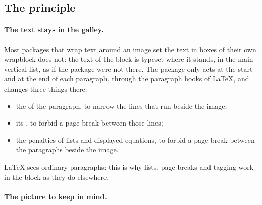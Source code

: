 \documentclass[a4paper,11pt]{article}
\newcommand\pkg[1]{\textsf{#1}}
\newcommand\key[1]{\texttt{#1}}
\newcommand\gv[1]{\mbox{\texttt{\textbackslash g\_\_wrapblock\_}}\csurl{#1}}
\begin{document}
\subsection{The principle}

\paragraph{The text stays in the galley.} Most packages that wrap text around an image set the text in boxes of their own. \pkg{wrapblock} does not: the text of the block is typeset where it stands, in the main vertical list, as if the package were not there. The package only acts at the start and at the end of each paragraph, through the paragraph hooks of \LaTeX, and changes three things there:
\begin{itemize}
\item the  of the paragraph, to narrow the lines that run beside the image;
\item its , to forbid a page break between those lines;
\item the penalties of lists and displayed equations, to forbid a page break between the paragraphs beside the image.
\end{itemize}
\LaTeX{} sees ordinary paragraphs: this is why lists, page breaks and tagging work in the block as they do elsewhere.

\paragraph{The picture to keep in mind.}

\begin{center}
\end{center}
\end{document}
